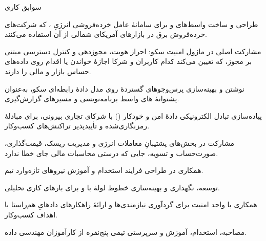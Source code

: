 \documentclass[11pt]{article}
\begin{document}
\begin{faSection}{سوابق کاری}

\begin{faItems}
  \item طراحی و ساخت واسط‌های  و  برای سامانۀ عامل خرده‌فروشی انرژیِ ، که شرکت‌های خرده‌فروش برق در بازارهای آمریکای شمالی از آن استفاده می‌کنند.
  \item مشارکت اصلی در ماژول امنیت سکو: احراز هویت، مجوزدهی و کنترل دسترسی مبتنی بر مجوز، که تعیین می‌کند کدام کاربران و شرکا اجازۀ خواندن یا اقدام روی داده‌های حساس بازار و مالی را دارند.
  \item نوشتن و بهینه‌سازی پرس‌وجوهای گستردۀ  روی مدل دادۀ رابطه‌ای سکو، به‌عنوان پشتوانۀ های واسط برنامه‌نویسی و مسیرهای گزارش‌گیری.
  \item پیاده‌سازی تبادل الکترونیکی دادۀ امن و خودکار () با شرکای تجاری بیرونی، برای مبادلۀ رمزنگاری‌شده و تأییدپذیر تراکنش‌های کسب‌وکار.
  \item مشارکت در بخش‌های پشتیبانِ معاملات انرژی و مدیریت ریسک، قیمت‌گذاری، صورت‌حساب و تسویه، جایی که درستی محاسبات مالی جای خطا ندارد.
  \item همکاری در طراحی فرایند استخدام و آموزش نیروهای تازه‌وارد تیم.
\end{faItems}

\begin{faItems}
  \item توسعه، نگهداری و بهینه‌سازی خطوط لولۀ  با  و  برای بارهای کاری تحلیلی.
  \item همکاری با واحد امنیت برای گردآوری نیازمندی‌ها و ارائۀ راهکارهای دادهایِ هم‌راستا با اهداف کسب‌وکار.
  \item مصاحبه، استخدام، آموزش و سرپرستی تیمی پنج‌نفره از کارآموزان مهندسی داده.
\end{faItems}

\end{faSection}
\end{document}
